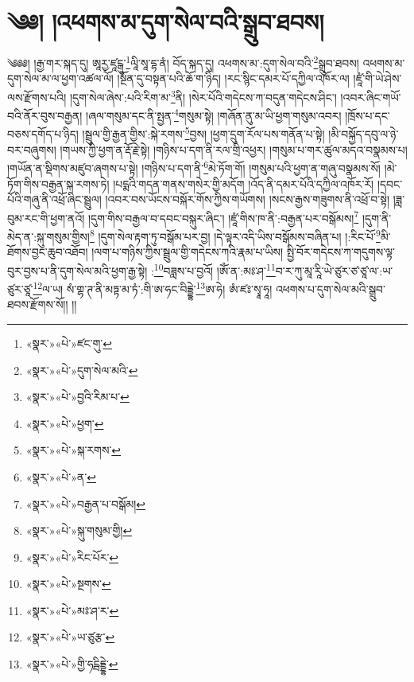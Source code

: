 \chapter{༄༅། །འཕགས་མ་དུག་སེལ་བའི་སྒྲུབ་ཐབས།}༄༅༅། །རྒྱ་གར་སྐད་དུ། ཨཱརྱ་ཛཱངྒུ་\footnote{«སྣར་»«པེ་»ཛང་གུ་}ལཱི་སཱ་དྷ་ནཾ། བོད་སྐད་དུ། འཕགས་མ་:དུག་སེལ་བའི་\footnote{«སྣར་»«པེ་»དུག་སེལ་མའི་}སྒྲུབ་ཐབས། འཕགས་མ་དུག་སེལ་མ་ལ་ཕྱག་འཚལ་ལོ། །སྔོན་དུ་བསྟན་པའི་ཆོ་ག་ཉིད། །རང་སྙིང་དམར་པོ་དཀྱིལ་འཁོར་ལ། །ཛཱཾ་གི་ཡེ་ཤེས་ལས་རྫོགས་པའི། །དུག་སེལ་ཞེས་:པའི་རིག་མ་\footnote{«སྣར་»«པེ་»བྱའི་རིམ་པ་}ནི། །སེར་པོའི་གདེངས་ཀ་བདུན་གདེངས་ཤིང་། །འབར་ཞིང་གཡོ་བའི་ནོར་བུས་བརྒྱན། །ཞལ་གསུམ་དང་ནི་སྤྱན་\footnote{«སྣར་»«པེ་»ཕྱག་}གསུམ་སྟེ། །གཞོན་ནུ་མ་ཡི་ཕྱག་གསུམ་འབར། །ཁྲོས་པ་དང་བཅས་དགོད་པ་ཉིད། །སྦྲུལ་གྱི་རྒྱན་གྱིས་:སྐེ་རགས་\footnote{«སྣར་»«པེ་»སྐ་རགས་}བྱས། །ཕྱག་དྲུག་རོལ་པས་གནོན་པ་སྟེ། །མི་བསྐྱོད་དབུ་ལ་ཉེ་བར་བཞུགས། །གཡས་ཀྱི་ཕྱག་ན་རྡོ་རྗེ་སྟེ། །གཉིས་པ་དག་ནི་རལ་གྲི་འཕྱར། །གསུམ་པ་གར་ཚུལ་མདའ་བསྣམས་པ། །གཡོན་ན་སྡིགས་མཛུབ་ཞགས་པ་སྟེ། །གཉིས་པ་དག་ནི་\footnote{«སྣར་»«པེ་»ན་}མེ་ཏོག་གོ། །གསུམ་པའི་ཕྱག་ན་གཞུ་བསྣམས་སོ། །མེ་ཏོག་གིས་བརྒྱན་སྐ་རགས་ཏེ། །པདྨའི་གདན་གནས་གསེར་གྱི་མདོག །འོད་ནི་དམར་པོའི་དཀྱིལ་འཁོར་རོ། །དབང་པོའི་གཞུ་ནི་འཕྲོ་ཞིང་སྦྲུལ། །འབར་བས་ཡོངས་བསྐོར་གོས་ཀྱིས་གཡོགས། །སངས་རྒྱས་གཟུགས་ནི་འཕྲོ་བ་སྟེ། །ཟླ་བུམ་རང་གི་ཕྱག་ནའོ། །དུག་གིས་བརྒྱལ་བ་དབང་བསྐུར་ཞིང་། །ཛཱཾ་གིས་ཁ་ནི་:བརྒྱན་པར་བསྒོམས།\footnote{«སྣར་»«པེ་»བརྒྱན་པ་བསྒོམ།} །དུག་ནི་མེད་ན་:སྐུ་གསུམ་གྱིས།\footnote{«སྣར་»«པེ་»སྐུ་གསུམ་གྱི།} །དུག་སེལ་རྟག་ཏུ་བསྒོམ་པར་བྱ། །དེ་ལྟར་འདི་ཡིས་བསྒོམས་བཞིན་པ། །:རིང་པོ་\footnote{«སྣར་»«པེ་»རིང་པོར་}མི་ཐོགས་བྱང་ཆུབ་འཐོབ། །ལག་པ་གཉིས་ཀྱིས་སྦྲུལ་གྱི་གདེངས་ཀའི་རྣམ་པ་ཡིས། སྤྱི་བོར་གདེངས་ཀ་གདུགས་ལྟ་བུར་བྱས་པ་ནི་དུག་སེལ་མའི་ཕྱག་རྒྱ་སྟེ། :\footnote{«སྣར་»«པེ་»སྔགས་}བཟླས་པ་བྱའོ། །ཨོཾ་ན་:མཿ་ཤ་\footnote{«སྣར་»«པེ་»མཿ་ཤ་ར་}བ་ར་ཀུ་མཱ་རཱི་ཡེ་ཙུར་ཙ་ཙཱ་ལ་:ཡ་ཙུར་ཙཱ་\footnote{«སྣར་»«པེ་»ཡ་ཙུརྩ་}ལ་ཡ། སཾ་གྷ་ཊ་ནི་མཏྟ་མ་ཏཾ་:གི་ཨ་ཧང་བིདྡྷེ་\footnote{«སྣར་»«པེ་»གྱི་ཧངྦིདྡྷེ་}ཨ་ཧེ། ཨཾ་ཛཿ་སྭཱ་ཧཱ། འཕགས་པ་དུག་སེལ་མའི་སྒྲུབ་ཐབས་རྫོགས་སོ།། །།
